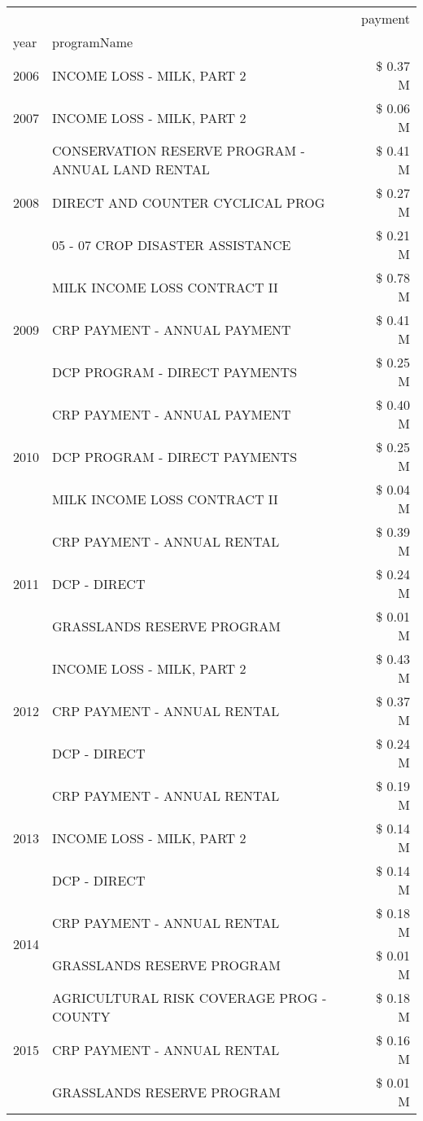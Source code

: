 \begin{tabular}{llr}
\toprule
 &  & payment \\
year & programName &  \\
\midrule
2006 & INCOME LOSS - MILK, PART 2 & \$ 0.37 M \\
\cline{1-3}
2007 & INCOME LOSS - MILK, PART 2 & \$ 0.06 M \\
\cline{1-3}
\multirow[t]{3}{*}{2008} & CONSERVATION RESERVE PROGRAM - ANNUAL LAND RENTAL & \$ 0.41 M \\
 & DIRECT AND COUNTER CYCLICAL PROG & \$ 0.27 M \\
 & 05 - 07 CROP DISASTER ASSISTANCE & \$ 0.21 M \\
\cline{1-3}
\multirow[t]{3}{*}{2009} & MILK INCOME LOSS CONTRACT II & \$ 0.78 M \\
 & CRP PAYMENT - ANNUAL PAYMENT & \$ 0.41 M \\
 & DCP PROGRAM - DIRECT PAYMENTS & \$ 0.25 M \\
\cline{1-3}
\multirow[t]{3}{*}{2010} & CRP PAYMENT - ANNUAL PAYMENT & \$ 0.40 M \\
 & DCP PROGRAM - DIRECT PAYMENTS & \$ 0.25 M \\
 & MILK INCOME LOSS CONTRACT II & \$ 0.04 M \\
\cline{1-3}
\multirow[t]{3}{*}{2011} & CRP PAYMENT - ANNUAL RENTAL & \$ 0.39 M \\
 & DCP - DIRECT & \$ 0.24 M \\
 & GRASSLANDS RESERVE PROGRAM & \$ 0.01 M \\
\cline{1-3}
\multirow[t]{3}{*}{2012} & INCOME LOSS - MILK, PART 2 & \$ 0.43 M \\
 & CRP PAYMENT - ANNUAL RENTAL & \$ 0.37 M \\
 & DCP - DIRECT & \$ 0.24 M \\
\cline{1-3}
\multirow[t]{3}{*}{2013} & CRP PAYMENT - ANNUAL RENTAL & \$ 0.19 M \\
 & INCOME LOSS - MILK, PART 2 & \$ 0.14 M \\
 & DCP - DIRECT & \$ 0.14 M \\
\cline{1-3}
\multirow[t]{2}{*}{2014} & CRP PAYMENT - ANNUAL RENTAL & \$ 0.18 M \\
 & GRASSLANDS RESERVE PROGRAM & \$ 0.01 M \\
\cline{1-3}
\multirow[t]{3}{*}{2015} & AGRICULTURAL RISK COVERAGE PROG - COUNTY & \$ 0.18 M \\
 & CRP PAYMENT - ANNUAL RENTAL & \$ 0.16 M \\
 & GRASSLANDS RESERVE PROGRAM & \$ 0.01 M \\

\end{tabular}
